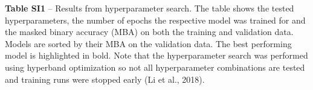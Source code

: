 \documentclass[11pt]{article}
\begin{document}
\pagestyle{empty}
\begin{table}[h]
    \centering
    \caption*{\textbf{Table SI1} -- Results from hyperparameter search. The table shows the tested hyperparameters, the number of epochs the respective model was trained for and the masked binary accuracy (MBA) on both the training and validation data. Models are sorted by their MBA on the validation data. The best performing model is highlighted in bold. Note that the hyperparameter search was performed using hyperband optimization so not all hyperparameter combinations are tested and training runs were stopped early (Li et al., 2018).}
    \small
    
\end{table}
\end{document}

